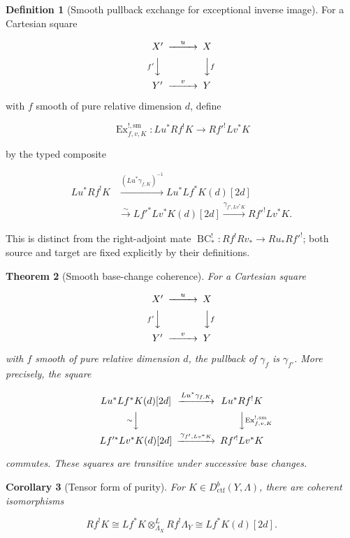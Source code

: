 \documentclass[10pt]{article}
\newtheorem{theorem}{Theorem}[section]
\newtheorem{corollary}[theorem]{Corollary}
\theoremstyle{definition}
\newtheorem{definition}[theorem]{Definition}
\newcommand{\Dctf}{D^b_{\mathrm{ctf}}}
\begin{document}
\begin{definition}[Smooth pullback exchange for exceptional inverse image]
For a Cartesian square

\[
\begin{CD}
X' @>{u}>> X\\
@V{f'}VV @VV{f}V\\
Y' @>{v}>> Y
\end{CD}
\]

with \(f\) smooth of pure relative dimension \(d\), define

\[
 \operatorname{Ex}^{!,\mathrm{sm}}_{f,v,K}:
 Lu^*Rf^!K\longrightarrow Rf'^!Lv^*K
\]

by the typed composite

\[
\begin{aligned}
 Lu^*Rf^!K
 &\xrightarrow{(Lu^*\gamma_{f,K})^{-1}}
 Lu^*Lf^*K(d)[2d]\\
 &\xrightarrow{\sim}Lf'^*Lv^*K(d)[2d]
 \xrightarrow{\gamma_{f',Lv^*K}}Rf'^!Lv^*K.
\end{aligned}
\]

This is distinct from the right-adjoint mate
\(\operatorname{BC}^!_*:Rf^!Rv_*\to Ru_*Rf'^!\); both source and target
are fixed explicitly by their definitions.
\end{definition}

\begin{theorem}[Smooth base-change coherence]
For a Cartesian square

\[
\begin{CD}
X' @>{u}>> X\\
@V{f'}VV @VV{f}V\\
Y' @>{v}>> Y
\end{CD}
\]

with \(f\) smooth of pure relative dimension \(d\), the pullback of
\(\gamma_f\) is \(\gamma_{f'}\).  More precisely, the square

\[
\begin{CD}
Lu^*Lf^*K(d)[2d] @>{Lu^*\gamma_{f,K}}>> Lu^*Rf^!K\\
@V{\sim}VV @VV{\operatorname{Ex}^{!,\mathrm{sm}}_{f,v,K}}V\\
Lf'^*Lv^*K(d)[2d] @>{\gamma_{f',Lv^*K}}>> Rf'^!Lv^*K
\end{CD}
\]

commutes.  These squares are transitive under successive base changes.
\end{theorem}

\begin{corollary}[Tensor form of purity]
For \(K\in\Dctf(Y,\Lambda)\), there are coherent isomorphisms

\[
 Rf^!K\cong Lf^*K\otimes^L_{\Lambda_X}Rf^!\Lambda_Y
 \cong Lf^*K(d)[2d].
\]
\end{corollary}
\end{document}
